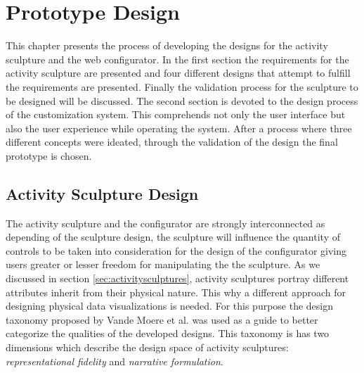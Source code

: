 \documentclass[../medieninformatik-arbeit.tex]{subfiles}
\begin{document}
\section{Prototype Design}
\label{ch:proto}
This chapter presents the process of developing the designs for the activity sculpture and the web configurator. In the first section the requirements for the activity sculpture are presented and four different designs that attempt to fulfill the requirements are presented. Finally the validation process for the sculpture to be designed will be discussed. The second section is devoted to the design process of the customization system. This comprehends not only the user interface but also the user experience while operating the system. After a process where three different concepts were ideated, through the validation of the design the final prototype is chosen. 

\subsection{Activity Sculpture Design}
The activity sculpture and the configurator are strongly interconnected as depending of the sculpture design, the sculpture will influence the quantity of controls to be taken into consideration for the design of the configurator giving users greater or lesser freedom for manipulating the the sculpture. As we discussed in section \ref{sec:activitysculptures}, activity sculptures portray different attributes inherit from their physical nature. This why a different approach for designing physical data visualizations is needed. For this purpose the design taxonomy proposed by Vande Moere et al.\cite{vande2009analyzing} was used as a guide to better categorize the qualities of the developed designs. This taxonomy is has two dimensions which describe the design space of activity sculptures: \textit{representational fidelity} and \textit{narrative formulation}. 
\end{document}
